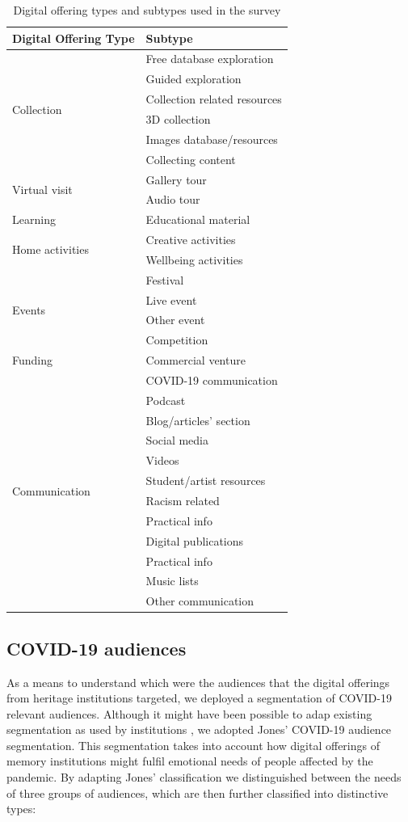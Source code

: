 \documentclass{egpubl}
\begin{document}
\begin{table}
\begin{tabular}{
	| l | l |}
    \hline
    \textbf{Digital Offering Type}  & \textbf{Subtype}  \\
    \hline
  \multirow{6}{*}{Collection} & Free database exploration  \\
&  Guided exploration  \\
&  Collection related resources \\
&  3D collection \\
&  Images database/resources \\
&  Collecting content \\
    \hline
 \multirow{2}{*}{Virtual visit} & Gallery tour  \\
&  Audio tour  \\
    \hline
 Learning & Educational material  \\
    \hline
 \multirow{2}{*}{Home activities} & Creative activities \\
&  Wellbeing activities  \\
    \hline
 \multirow{4}{*}{Events} & Festival\\
&  Live event \\
&  Other event\\
&  Competition \\
    \hline
 Funding & Commercial venture \\
    \hline
 \multirow{12}{*}{Communication} & COVID-19 communication \\
& Podcast \\
& Blog/articles' section \\
& Social media  \\
& Videos \\
& Student/artist resources \\
& Racism related \\
& Practical info \\
& Digital publications \\
& Practical info \\
& Music lists \\
& Other communication\\
    \hline
\end{tabular}
\caption{\label{tab:digoffer}Digital offering types and subtypes used in the survey}
\end{table}
\normalsize

\subsection{COVID-19 audiences}
\label{covaud}
As a means to understand which were the audiences that the digital offerings from heritage institutions targeted, we deployed a segmentation of COVID-19 relevant audiences. Although it might have been possible to adap existing segmentation as used by institutions \cite{Drot19}, we adopted Jones' \cite{Audiences2020} COVID-19 audience segmentation. This segmentation takes into account how digital offerings of memory institutions might fulfil emotional needs of people affected by the pandemic. By adapting Jones' classification we distinguished between the needs of three groups of audiences, which are then further classified into distinctive types: 
\end{document}
